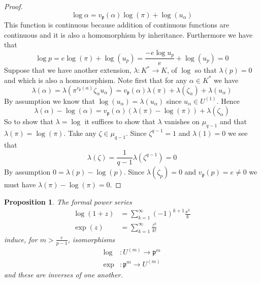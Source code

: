 \documentclass{article}
\newtheorem{proposition}{Proposition}[section]
\newcommand{\mfrak}[1]{\mathfrak{#1}}
\begin{document}
\begin{proof}
    $$\log \alpha = v_\mfrak p(\alpha)\log(\pi) + \log(u_\alpha)$$
    This function is continuous because addition of continuous functions are continuous and it is also a homomorphism by inheritance. Furthermore we have that
    $$\log p = e\log(\pi) + \log(u_p) = \frac{-e\log u_p}{e} + \log(u_p) = 0 $$
    Suppose that we have another extension, $\lambda : K^* \to K$, of $\log$ so that $\lambda(p) = 0$ and which is also a homomorphism. Note first that for any $\alpha \in K^*$ we have
    $$\lambda(\alpha) = \lambda(\pi^{v_\mfrak p(\alpha)}\zeta_\alpha u_\alpha) = {v_\mfrak p(\alpha)}\lambda(\pi) + \lambda(\zeta_\alpha) + \lambda(u_\alpha)$$ 
    By assumption we know that $\log(u_\alpha) = \lambda(u_\alpha)$ since $u_\alpha \in U^{(1)}$. Hence 
    $$\lambda(\alpha) - \log(\alpha) = {v_\mfrak p(\alpha)}(\lambda(\pi)-\log(\pi))  + \lambda(\zeta_\alpha)$$
    So to show that $\lambda = \log$ it suffices to show that $\lambda$ vanishes on $\mu_{q-1}$ and that $\lambda(\pi) = \log(\pi)$. Take any $\zeta \in \mu_{q-1}$. Since $\zeta^{q-1} = 1$ and $\lambda(1) = 0$ we see that
    $$\lambda(\zeta) = \frac{1}{q-1}\lambda(\zeta^{q-1}) = 0$$
    By assumption $0 = \lambda(p) - \log(p)$. Since $\lambda(\zeta_p) = 0$ and $v_\mfrak p(p) = e \neq 0$ we must have $\lambda(\pi) - \log(\pi) = 0$.
\end{proof}
\begin{proposition}\label{prop: Log and exp for local fields}
    The formal power series 
    \begin{align*}
        \log(1+z) &= \sum_{k = 1}^\infty (-1)^{k+1}\frac{x^k}{k} \\
        \exp(z) &= \sum_{k = 1}^\infty \frac{z^k}{k!} 
    \end{align*}
    induce, for $m > \frac{e}{p-1}$, isomorphisms
    \begin{align*}
        \log &: U^{(m)} \to \mfrak p^m \\ 
        \exp &: \mfrak p^m \to U^{(m)}
    \end{align*}
    and these are inverses of one another.
\end{proposition}
\end{document}
